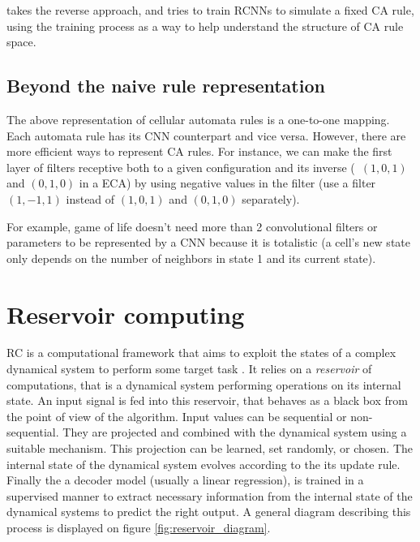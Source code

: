\textcite{gilpinCellularAutomataConvolutional2018} takes the reverse approach, and
tries to train RCNNs to simulate a fixed CA rule, using the training process as
a way to help understand the structure of CA rule space.

\subsection{Beyond the naive rule representation}

The above representation of cellular automata rules is a one-to-one mapping.
Each automata rule has its CNN counterpart and vice versa. However, there are
more efficient ways to represent CA rules. For instance, we can make the first
layer of filters receptive both to a given configuration and its inverse
(\eg~$(1, 0, 1)$ and $(0, 1, 0)$ in a ECA) by using negative values in the
filter (use a filter $(1, -1, 1)$ instead of $(1, 0, 1)$ and $(0, 1, 0)$
separately).

For example, game of life doesn't need more than 2 convolutional filters or
parameters to be represented by a CNN because it is totalistic (a cell's new
state only depends on the number of neighbors in state 1 and its current state).


\section{Reservoir computing \label{sec:res-models}}
\Ac{RC} is a computational framework that aims to exploit the states of a
complex dynamical system to perform some target task
\parencite{tanakaRecentAdvancesPhysical2019}. It relies on a \emph{reservoir} of
computations, that is a dynamical system performing operations on its internal
state. An input signal is fed into this reservoir, that behaves as a black box
from the point of view of the algorithm. Input values can be sequential or
non-sequential. They are projected and combined with the dynamical system using
a suitable mechanism. This projection can be learned, set randomly, or chosen.
The internal state of the dynamical system evolves according to the its update
rule. Finally the a decoder model (usually a linear regression), is trained in a
supervised manner to extract necessary information from the internal state of
the dynamical systems to predict the right output. A general diagram describing
this process is displayed on figure \ref{fig:reservoir_diagram}.

